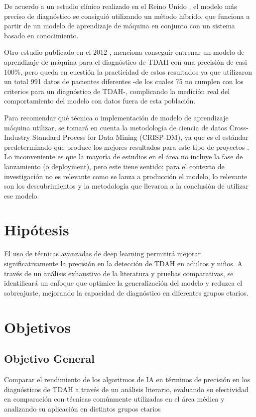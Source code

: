 \documentclass[10pt,journal,compsoc]{IEEEtran}
\begin{document}
De acuerdo a un estudio clínico realizado en el Reino Unido \cite{chen-2023}, el modelo más preciso de diagnóstico se consiguió utilizando un método híbrido, que funciona a partir de un modelo de aprendizaje de máquina en conjunto con un sistema basado en conocimiento.

Otro estudio publicado en el 2012 \cite{wall-2012}, menciona conseguir entrenar un modelo de aprendizaje de máquina para el diagnóstico de TDAH con una precisión de casi 100\%, pero queda en cuestión la practicidad de estos resultados ya que utilizaron un total 991 datos de pacientes diferentes -de los cuales 75 no cumplen con los criterios para un diagnóstico de TDAH-, complicando la medición real del comportamiento del modelo con datos fuera de esta población.

Para recomendar qué técnica o implementación de modelo de aprendizaje máquina utilizar, se tomará en cuenta la metodología de ciencia de datos Cross-Industry Standard Process for Data Mining (CRISP-DM), ya que es el estándar predeterminado que produce los mejores resultados para este tipo de proyectos \cite{schroer-2021}. Lo inconveniente es que la mayoría de estudios en el área no incluye la fase de lanzamiento (o deployment), pero este tiene sentido: para el contexto de investigación no es relevante como se lanza a producción el modelo, lo relevante son los descubrimientos y la metodología que llevaron a la conclusión de utilizar ese modelo.

\section{Hipótesis}
El uso de técnicas avanzadas de deep learning permitirá mejorar significativamente la precisión en la detección de TDAH en adultos y niños. A través de un análisis exhaustivo de la literatura y pruebas comparativas, se identificará un enfoque que optimice la generalización del modelo y reduzca el sobreajuste, mejorando la capacidad de diagnóstico en diferentes grupos etarios.

\section{Objetivos}
\subsection{Objetivo General}
Comparar el rendimiento de los algoritmos de IA en términos de precisión en los diagnósticos de TDAH a través de un análisis literario, evaluando su efectividad en comparación con técnicas comúnmente utilizadas en el área médica y analizando su aplicación en distintos grupos etarios
\end{document}
